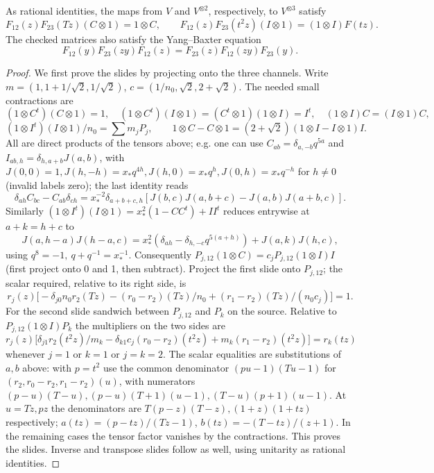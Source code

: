 \begin{lemma}\label{lem:pv:local-relations}
As rational identities, the maps from \(V\) and \(V^{\otimes2}\), respectively,
to \(V^{\otimes3}\) satisfy
\[
 F_{12}(z)F_{23}(Tz)(C\otimes1)=1\otimes C,\qquad
 F_{12}(z)F_{23}(t^2 z)(I\otimes1)=(1\otimes I)F(tz).
\]
The checked matrices also satisfy the Yang--Baxter equation
\[
 F_{12}(y)F_{23}(zy)F_{12}(z)
 =F_{23}(z)F_{12}(zy)F_{23}(y).
\]
\end{lemma}

\begin{proof}
We first prove the slides by projecting onto the three channels. Write
\(m=(1,1+1/\sqrt2,1/\sqrt2)\), \(c=(1/n_0,\sqrt2,2+\sqrt2)\).
The needed small contractions are
\[
 (1\otimes C^t)(C\otimes1)=1,\quad
 (1\otimes C^t)(I\otimes1)=(C^t\otimes1)(1\otimes I)=I^t,\quad
 (1\otimes I)C=(I\otimes1)C,
\]
\[
 (1\otimes I^t)(I\otimes1)/n_0=\sum m_j P_j,\qquad
 1\otimes C-C\otimes1=(2+\sqrt2)(1\otimes I-I\otimes1)I.
\]
All are direct products of the tensors above; e.g. one can use \(C_{ab}=\delta_{a,-b}q^{5a}\) and \(I_{ab,h}=\delta_{h,a+b}J(a,b)\), with \(J(0,0)=1, J(h,-h)=x_*q^{4h},J(h,0)=x_*q^h,J(0,h)=x_*q^{-h}\) for \(h\ne0\) (invalid labels zero); the last identity reads
\[
 \delta_{ah} C_{bc}-C_{ab}\delta_{ch}
 =x_*^{-2}\delta_{a+b+c,h}
 [J(b,c)J(a,b+c)-J(a,b)J(a+b,c)] .
\]
Similarly \((1\otimes I^t)(I\otimes1)=x_*^2(1-CC^t)+II^t\) reduces entrywise at \(a+k=h+c\) to
\[
 J(a,h-a)J(h-a,c)=x_*^2(\delta_{ah}-\delta_{h,-c}q^{5(a+h)})+J(a,k)J(h,c),
\]
using \(q^8=-1,\ q+q^{-1}=x_*^{-1}\).
Consequently \(P_{j,12}(1\otimes C)=c_j P_{j,12}(1\otimes I)I\) (first project onto 0 and 1, then subtract). Project the first slide onto \(P_{j,12}\); the scalar required, relative to its right side, is
\[
 r_j(z)\big[-\delta_{j0}n_0 r_2(Tz)
 -(r_0-r_2)(Tz)/n_0+(r_1-r_2)(Tz)/(n_0 c_j)\big]=1 .
\]
For the second slide sandwich between \(P_{j,12}\) and \(P_k\) on the source. Relative to \(P_{j,12}(1\otimes I)P_k\) the multipliers on the two sides are
\[
 r_j(z)\big[\delta_{j1}r_2(t^2 z)/m_k-\delta_{k1}c_j (r_0-r_2)(t^2 z)+m_k(r_1-r_2)(t^2 z)\big]=r_k(tz)
\]
whenever \(j=1\) or \(k=1\) or \(j=k=2\). The scalar equalities are substitutions of \(a,b\) above: with \(p=t^2\) use the common denominator \((pu-1)(Tu-1)\) for \((r_2,r_0-r_2,r_1-r_2)(u)\), with numerators \((p-u)(T-u),(p-u)(T+1)(u-1),(T-u)(p+1)(u-1)\). At \(u=Tz,pz\) the denominators are \(T(p-z)(T-z),(1+z)(1+tz)\) respectively; \(a(tz)=(p-tz)/(Tz-1)\), \(b(tz)=-(T-tz)/(z+1)\). In the remaining cases the tensor factor vanishes by the contractions. This proves the slides. Inverse and transpose slides follow as well, using unitarity as rational identities.


\end{proof}
